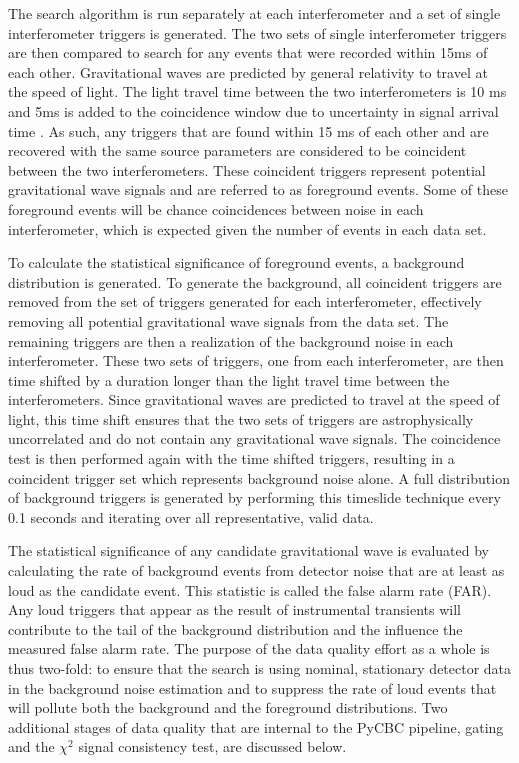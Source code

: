 The search algorithm is run separately at each interferometer and a set of single interferometer
triggers is generated. The two sets of single interferometer triggers are then compared to
search for any events that were recorded within 15ms of each other.
Gravitational waves are predicted by general relativity to travel
at the speed of light. The light travel time between the two interferometers is 10 ms
and 5ms is added to the coincidence window due to uncertainty in signal arrival time
\cite{GW150914-CBC}.
As such, any triggers that are found within 15 ms of each other and
are recovered with the same source parameters are considered to be coincident between the two
interferometers. These coincident triggers represent potential gravitational wave signals
and are referred to as foreground events. Some of these foreground events will be
chance coincidences between noise in each interferometer, which is expected given
the number of events in each data set.

To calculate the statistical significance of foreground events,
a background distribution is generated.
To generate the background, all coincident triggers are removed
from the set of triggers generated for each interferometer, effectively removing all
potential gravitational wave signals from the data set. The remaining triggers are then
a realization of the background noise in each interferometer. These two sets of triggers,
one from each interferometer, are then time shifted by a duration longer than the
light travel time between the interferometers.
Since gravitational waves are predicted to travel at the speed of light,
this time shift ensures that the
two sets of triggers are astrophysically uncorrelated and do not contain any gravitational
wave signals. The coincidence test is then performed again with the time shifted triggers,
resulting in a coincident trigger set which represents background noise alone.
A full distribution of background triggers is generated by performing this timeslide
technique every 0.1 seconds and iterating over all representative, valid data.

The statistical significance of any candidate gravitational wave is
evaluated by calculating the rate of background events from detector noise that are at least as
loud as the candidate event. This statistic is called the false alarm rate (FAR).
Any loud triggers that appear as the result of instrumental
transients will contribute to the tail of the background distribution and
the influence the measured false alarm rate.
The purpose of the data quality effort as a whole is thus two-fold: to ensure that the
search is using nominal, stationary
detector data in the background noise estimation and to suppress the rate of loud events
that will pollute both the background and the foreground distributions.
Two additional stages of data quality that are internal to the PyCBC pipeline, gating and
the $\chi^{2}$ signal consistency test, are discussed below.

